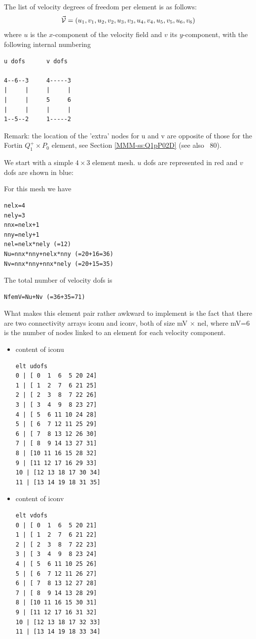 The list of velocity degrees of freedom per element is as follows:
\[
\vec{\cal V} = (u_1,v_1,u_2,v_2,u_3,v_3,u_4,v_4,u_5,v_5,u_6,v_6)
\]
where $u$ is the $x$-component of the velocity field and $v$ its $y$-component,
with the following internal numbering
\begin{verbatim}
u dofs      v dofs

4--6--3     4-----3
|     |     |     |
|     |     5     6
|     |     |     |
1--5--2     1-----2
\end{verbatim}

Remark: the location of the 'extra' 
nodes for u and v are opposite of those for the Fortin $Q_1^+\times P_0$ element, see
Section \ref{MMM-ss:Q1pP02D} (see also \stone~80).

We start with a simple $4\times 3$ element mesh.
$u$ dofs are represented in red and $v$ dofs are shown in blue:





For this mesh we have 

\begin{lstlisting}
nelx=4
nely=3
nnx=nelx+1
nny=nely+1
nel=nelx*nely (=12) 
Nu=nnx*nny+nelx*nny (=20+16=36)
Nv=nnx*nny+nnx*nely (=20+15=35)
\end{lstlisting}

The total number of velocity dofs is 
\begin{lstlisting}
NfemV=Nu+Nv (=36+35=71)
\end{lstlisting}

What makes this element pair rather awkward to implement is the fact that 
there are two connectivity arrays {\python iconu} and {\python iconv}, both of size 
{\python mV} $\times$ {\python nel}, where 
{\python mV=6} is the number of nodes linked to an element for each velocity component. 
\begin{itemize}
\item content of {\python iconu}
\begin{verbatim}
elt udofs 
0 | [ 0  1  6  5 20 24]
1 | [ 1  2  7  6 21 25]
2 | [ 2  3  8  7 22 26]
3 | [ 3  4  9  8 23 27]
4 | [ 5  6 11 10 24 28]
5 | [ 6  7 12 11 25 29]
6 | [ 7  8 13 12 26 30]
7 | [ 8  9 14 13 27 31]
8 | [10 11 16 15 28 32]
9 | [11 12 17 16 29 33]
10 | [12 13 18 17 30 34]
11 | [13 14 19 18 31 35]
\end{verbatim}
\item content of {\python iconv}
\begin{verbatim}
elt vdofs 
0 | [ 0  1  6  5 20 21]
1 | [ 1  2  7  6 21 22]
2 | [ 2  3  8  7 22 23]
3 | [ 3  4  9  8 23 24]
4 | [ 5  6 11 10 25 26]
5 | [ 6  7 12 11 26 27]
6 | [ 7  8 13 12 27 28]
7 | [ 8  9 14 13 28 29]
8 | [10 11 16 15 30 31]
9 | [11 12 17 16 31 32]
10 | [12 13 18 17 32 33]
11 | [13 14 19 18 33 34]
\end{verbatim}
\end{itemize}


